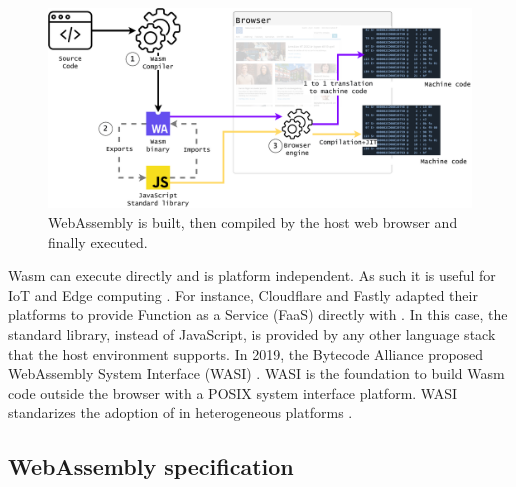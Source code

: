 \begin{figure}[h]
    \centering
    \includegraphics[width=\linewidth]{diagrams/wasm_workflow.pdf}
    \caption{WebAssembly is built, then compiled by the host web browser and finally executed. }
    \label{diagrams:sota:wasm}
\end{figure}

Wasm can execute directly and is platform independent. As such it is useful for IoT and Edge computing \cite{Narayan2021Swivel,Sledge}. For instance, Cloudflare and Fastly adapted their platforms to provide Function as a Service (FaaS) directly with \wasm. In this case, the standard library, instead of JavaScript, is provided by any other language stack that the host environment supports.
In 2019, the Bytecode Alliance \cite{bytecodealliance} proposed WebAssembly System Interface (WASI) \cite{WASI}. WASI is the foundation to build Wasm code outside the browser with a POSIX system interface platform. WASI standarizes the adoption of \wasm in heterogeneous platforms \cite{bryant2020webassembly}. 


%







\subsection{WebAssembly specification}

